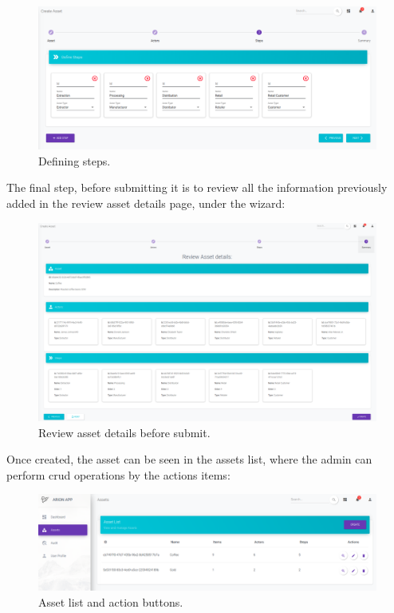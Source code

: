 \begin{figure}[H]
\begin{center}
  \includegraphics[scale=0.27]{images/use_example/03_create_asset_3.png}
\caption{Defining steps.}
\label{fig:create_asset_3}
\end{center}
\end{figure}

The final step, before submitting it is to review all the information previously added in the review asset details page, under the wizard:
\begin{figure}[H]
\begin{center}
  \includegraphics[scale=0.265]{images/use_example/04_create_asset_4.png}
\caption{Review asset details before submit.}
\label{fig:create_asset_4}
\end{center}
\end{figure}


Once created, the asset can be seen in the assets list, where the admin can perform crud operations by the actions items:
\begin{figure}[H]
\begin{center}
  \includegraphics[scale=0.28]{images/use_example/05_asset_list.png}
\caption{Asset list and action buttons.}
\label{fig:asset_list}
\end{center}
\end{figure}

